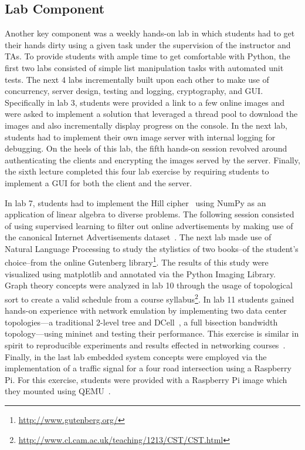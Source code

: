 \documentclass[letterpaper,twocolumn,10pt]{article}
\begin{document}
\subsection{Lab Component}\label{sec:lab}
Another key component was a weekly hands-on lab in which students had to get
their hands dirty using a given task under the supervision of the instructor and
TAs. To provide students with ample time to get comfortable with Python, the
first two labs consisted of simple list manipulation tasks with automated unit
tests. The next 4 labs incrementally built upon each other to make use of
concurrency, server design, testing and logging, cryptography, and GUI.
Specifically in lab 3, students were provided a link to a few online images and
were asked to implement a solution that leveraged a thread pool to download the
images and also incrementally display progress on the console. In the next lab,
students had to implement their own image server with internal logging for
debugging. On the heels of this lab, the fifth hands-on session revolved around
authenticating the clients and encrypting the images served by the server.
Finally, the sixth lecture completed this four lab exercise by requiring
students to implement a GUI for both the client and the server.

In lab 7, students had to implement the Hill cipher~\cite{hill1929cryptography}
using NumPy as an application of linear algebra to diverse problems. The
following session consisted of using supervised learning to filter out online
advertisements by making use of the canonical Internet Advertisements
dataset~\cite{Kushmerick:1999:LRI}. The next lab made use of Natural Language
Processing to study the stylistics of two books--of the student's choice--from
the online Gutenberg library\footnote{\url{http://www.gutenberg.org/}}. The
results of this study were visualized using matplotlib and annotated via the
Python Imaging Library. Graph theory concepts were analyzed in lab 10 through
the usage of topological sort to create a valid schedule from a course
syllabus\footnote{\url{http://www.cl.cam.ac.uk/teaching/1213/CST/CST.html}}. In
lab 11 students gained hands-on experience with network emulation by
implementing two data center topologies---a traditional 2-level tree and
DCell~\cite{Guo:2008:DSF}, a full bisection bandwidth topology---using mininet
and testing their performance. This exercise is similar in spirit to
reproducible experiments and results effected in networking
courses~\cite{Handigol:2012:RNE}. Finally, in the last lab embedded system
concepts were employed via the implementation of a traffic signal for a four
road intersection using a Raspberry Pi. For this exercise, students were
provided with a Raspberry Pi image which they mounted using
QEMU~\cite{Bellard:2005:QFP}.
\end{document}
